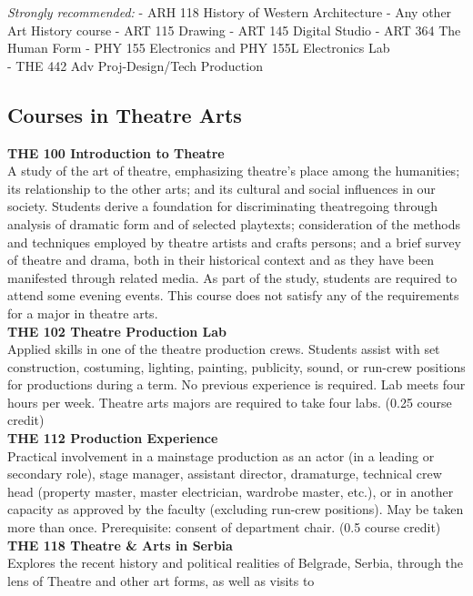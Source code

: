 \documentclass[
  letterpaper,
]{scrbook}
\begin{document}
\emph{Strongly recommended:} - ARH 118 History of Western Architecture -
Any other Art History course - ART 115 Drawing - ART 145 Digital Studio
- ART 364 The Human Form - PHY 155 Electronics and PHY 155L Electronics
Lab\\
- THE 442 Adv Proj-Design/Tech Production

\subsection{Courses in Theatre Arts}\label{sec-courses-in-theatre-arts}

\textbf{THE 100 Introduction to Theatre}\\
A study of the art of theatre, emphasizing theatre's place among the
humanities; its relationship to the other arts; and its cultural and
social influences in our society. Students derive a foundation for
discriminating theatregoing through analysis of dramatic form and of
selected playtexts; consideration of the methods and techniques employed
by theatre artists and crafts persons; and a brief survey of theatre and
drama, both in their historical context and as they have been manifested
through related media. As part of the study, students are required to
attend some evening events. This course does not satisfy any of the
requirements for a major in theatre arts.\\
\textbf{THE 102 Theatre Production Lab}\\
Applied skills in one of the theatre production crews. Students assist
with set construction, costuming, lighting, painting, publicity, sound,
or run-crew positions for productions during a term. No previous
experience is required. Lab meets four hours per week. Theatre arts
majors are required to take four labs. (0.25 course credit)\\
\textbf{THE 112 Production Experience}\\
Practical involvement in a mainstage production as an actor (in a
leading or secondary role), stage manager, assistant director,
dramaturge, technical crew head (property master, master electrician,
wardrobe master, etc.), or in another capacity as approved by the
faculty (excluding run-crew positions). May be taken more than once.
Prerequisite: consent of department chair. (0.5 course credit)\\
\textbf{THE 118 Theatre \& Arts in Serbia}\\
Explores the recent history and political realities of Belgrade, Serbia,
through the lens of Theatre and other art forms, as well as visits to
\end{document}
